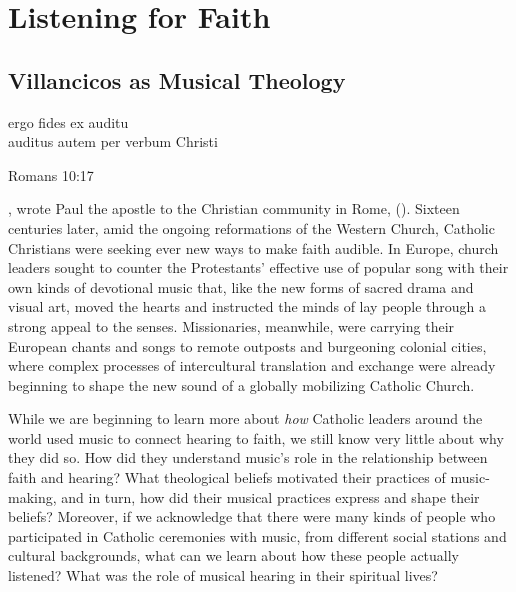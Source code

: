 % 

\part{Listening for Faith}
\label{part:faith}

\chapter{Villancicos as Musical Theology}
\label{ch:intro}

\epigraph
{ergo fides ex auditu\\
auditus autem per verbum Christi}
{Romans 10:17}

, wrote Paul the apostle to the Christian
community in Rome, 
().
Sixteen centuries later, amid the ongoing reformations of the Western Church,
Catholic Christians were seeking ever new ways to make faith audible.
In Europe, church leaders sought to counter the Protestants' effective use of
popular song with their own kinds of devotional music that, like the new forms
of sacred drama and visual art, moved the hearts and instructed the minds of
lay people through a strong appeal to the senses.
Missionaries, meanwhile, were carrying their European chants and songs to
remote outposts and burgeoning colonial cities, where complex processes of
intercultural translation and exchange were already beginning to shape the new
sound of a globally mobilizing Catholic Church.

While we are beginning to learn more about \emph{how} Catholic leaders around
the world used music to connect hearing to faith, we still know very little
about why they did so.
How did they understand music's role in the relationship between faith and
hearing?
What theological beliefs motivated their practices of music-making, and in
turn, how did their musical practices express and shape their beliefs?
Moreover, if we acknowledge that there were many kinds of people who
participated in Catholic ceremonies with music, from different social stations
and cultural backgrounds, what can we learn about how these people actually
listened?
What was the role of musical hearing in their spiritual lives?  

